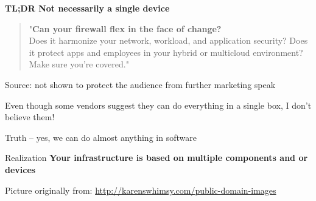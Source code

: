 \documentclass[Screen16to9,17pt]{foils}
\begin{document}
{\bf TL;DR Not necessarily a single device}






\begin{quote}
"{\bf Can your firewall flex in the face of change?}\\
Does it harmonize your network, workload, and application security? Does it protect apps and employees in your hybrid or multicloud environment? Make sure you're covered."
\end{quote}
Source: not shown to protect the audience from further marketing speak






\begin{list2}
\item Even though some vendors suggest they can do everything in a single box, I don't believe them!
\item Truth -- yes, we can do almost anything in software
\item Realization {\bf Your infrastructure is based on multiple components and or devices}
\end{list2}


\centerline{Picture originally from: \url{http://karenswhimsy.com/public-domain-images}}



%




\end{document}
